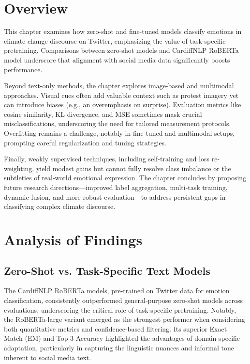 \section{Overview}
This chapter examines how zero-shot and fine-tuned models classify emotions in climate change discourse on Twitter, emphasizing the value of task-specific pretraining. Comparisons between zero-shot models and CardiffNLP RoBERTa model underscore that alignment with social media data significantly boosts performance. 
\newline

Beyond text-only methods, the chapter explores image-based and multimodal approaches. Visual cues often add valuable context such as protest imagery yet can introduce biases (e.g., an overemphasis on surprise). Evaluation metrics like cosine similarity, KL divergence, and MSE sometimes mask crucial misclassifications, underscoring the need for tailored measurement protocols. Overfitting remains a challenge, notably in fine-tuned and multimodal setups, prompting careful regularization and tuning strategies.
\newline

Finally, weakly supervised techniques, including self-training and loss re-weighting, yield modest gains but cannot fully resolve class imbalance or the subtleties of real-world emotional expression. The chapter concludes by proposing future research directions—improved label aggregation, multi-task training, dynamic fusion, and more robust evaluation—to address persistent gaps in classifying complex climate discourse.

\section{Analysis of Findings}
\subsection{Zero-Shot vs. Task-Specific Text Models}

The CardiffNLP RoBERTa models, pre-trained on Twitter data for emotion classification, consistently outperformed general-purpose zero-shot models across evaluations, underscoring the critical role of task-specific pretraining. Notably, the RoBERTa-large variant emerged as the strongest performer when considering both quantitative metrics and confidence-based filtering. Its superior Exact Match (EM) and Top-3 Accuracy highlighted the advantages of domain-specific adaptation, particularly in capturing the linguistic nuances and informal tone inherent to social media text.
\newline


